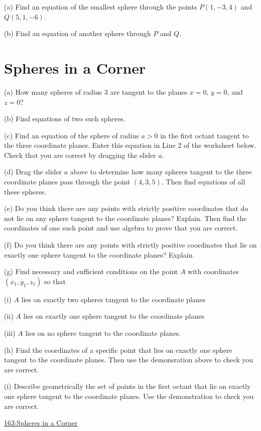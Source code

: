 \documentclass{ximera}
\begin{document}
\begin{example}  \label{Ex:Dfererg556}
(a) Find an equation of the smallest sphere through the points $P(1,-3,4)$ and $Q(5,1,-6)$.

(b) Find an equation of another sphere through $P$ and $Q$.

\end{example}


\section*{Spheres in a Corner}
\begin{question}  \label{Q3442g455t}
(a) How many spheres of radius $3$ are tangent to the planes $x=0$, $y=0$, and $z=0$?

(b) Find equations of two such spheres.

(c) Find an equation of the sphere of radius $a > 0$ in the first octant tangent to the three coordinate planes. Enter this equation in Line 2 of the worksheet below. Check that you are correct by dragging the slider $a$.

\begin{exploration}
\begin{onlineOnly}
    \begin{center}
\end{center}
\end{onlineOnly}

(d) Drag the slider $a$ above to determine how many spheres tangent to the three coordinate planes pass through the point $(4,3,5)$. Then find equations of all these spheres.

(e) Do you think there are any points with strictly positive coordinates that do not lie on any sphere tangent to the coordinate planes? Explain. Then find the coordinates of one such point and use algebra to prove that you are correct. 

(f) Do you think there are any points with strictly positive coordinates that lie on exactly one sphere tangent to the coordinate planes? Explain.

(g) Find necessary and sufficient conditions on the point $A$ with coordinates $(x_1, y_1, z_1)$ so that 

(i) $A$ lies on exactly two spheres tangent to the coordinate planes

(ii) $A$ lies on exactly one sphere tangent to the coordinate planes

(iii) $A$ lies on no sphere tangent to the coordinate planes.

(h) Find the coordinates of a specific point that lies on exactly one sphere tangent to the coordinate planes. Then use the demonsration above to check you are correct.

(i) Describe geometrically the set of points in the first octant that lie on exactly one sphere tangent to the coordinate planes. Use the demonstration to check you are correct.


\href{https://www.desmos.com/3d/ljizsai4mu}{163:Spheres in a Corner}

\end{exploration}

\end{question}
\end{document}
